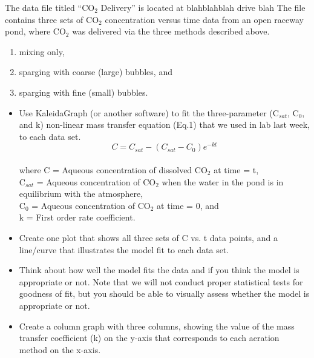 \documentclass[12pt,letterpaper]{article}
\begin{document}
The data file titled ``CO$_2$ Delivery'' is located at blahblahblah drive blah %
The file contains three sets of CO$_2$ concentration versus time data from an open raceway pond, where  CO$_2$ was delivered via the three methods described above.

\begin{enumerate}
\item mixing only, 
\item sparging with coarse (large) bubbles, and 
\item sparging with fine (small) bubbles.
\end{enumerate}

\begin{itemize} 
\item Use KaleidaGraph (or another software) to fit the three-parameter (C$_{sat}$, C$_0$, and k) non-linear mass transfer equation (Eq.1) that we used in lab last week, to each data set.\\

\begin{equation}
C = C_{sat} - (C_{sat} - C_0)e^{-kt}
\end{equation}\\

where C = Aqueous concentration of dissolved CO$_2$ at time = t,\\

C$_{sat}$ = Aqueous concentration of CO$_2$ when the water in the pond is in equilibrium with the atmosphere,\\

C$_0$ = Aqueous concentration of CO$_2$ at time = 0, and\\

k = First order rate coefficient.\\



\item Create one plot that shows all three sets of C vs. t data points, and a line/curve that illustrates the model fit to each data set. 
\item Think about how well the model fits the data and if you think the model is appropriate or not. Note that we will not conduct proper statistical tests for goodness of fit, but you should be able to visually assess whether the model is appropriate or not.
\item Create a column graph with three columns, showing the value of the mass transfer coefficient (k) on the y-axis that corresponds to each aeration method on the x-axis.
 
\end{itemize}
\end{document}
